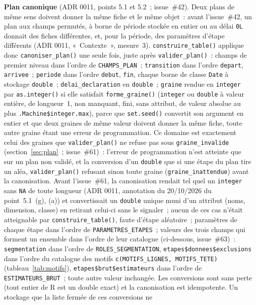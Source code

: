 \documentclass[a4paper,11pt]{article}
\newcommand{\code}[1]{\texttt{\small #1}}
\begin{document}
\noindent
\textbf{Plan canonique} (ADR 0011, points 5.1 et 5.2~; issue~\#42). Deux plans
de même sens doivent donner la même fiche et le même objet~: avant
l'issue~\#42, un plan aux champs permutés, à borne de période stockée en
entier ou au délai \code{0L} donnait des fiches différentes, et, pour la
période, des paramètres d'étape différents (ADR 0011, «~Contexte~»,
mesure~3). \code{construire\_table()}
applique donc \code{canoniser\_plan()} une seule fois, juste après
\code{valider\_plan()}~: champs de premier niveau dans l'ordre de
\code{CHAMPS\_PLAN}~; \code{transition} dans l'ordre \code{depart},
\code{arrivee}~; \code{periode} dans l'ordre \code{debut}, \code{fin},
chaque borne de classe \code{Date} à stockage \code{double}~;
\code{delai\_declaration} en \code{double}~; \code{graine} rendue en
\code{integer} par \code{as.integer()} si elle satisfait
\code{forme\_graine()} (\code{integer} ou \code{double} à valeur entière,
de longueur~1, non manquant, fini, sans attribut, de valeur absolue au plus
\code{.Machine\$integer.max}), parce que \code{set.seed()} convertit son
argument en entier et que deux graines de même valeur doivent donner la même
fiche, toute autre graine étant une erreur de programmation. Ce domaine est
exactement celui des graines que \code{valider\_plan()} ne refuse pas
sous \code{graine\_invalide} (section~\ref{sec:plan}~; issue~\#61)~: l'erreur de
programmation n'est atteinte que sur un plan non validé, et la conversion
d'un \code{double} que si une étape du plan tire un aléa,
\code{valider\_plan()} refusant sinon toute graine
(\code{graine\_inattendue}) avant la canonisation. Avant l'issue~\#61, la
canonisation rendait tel quel un \code{integer} sans \code{NA} de toute
longueur (ADR 0011, annotation du 20/10/2026 du point~5.1~(g), (a)) et
convertissait un \code{double} unique muni d'un attribut (noms, dimension,
classe) en retirant celui-ci sans le signaler~; aucun de ces cas n'était atteignable par
\code{construire\_table()}, faute d'étape aléatoire~; paramètres de chaque étape dans l'ordre de
\code{PARAMETRES\_ETAPES}~; valeurs des trois champs qui forment un
ensemble dans l'ordre de leur catalogue (ci-dessous, issue~\#63)~:
\code{segmentation} dans l'ordre de \code{ROLES\_SEGMENTATION},
\code{etapes\$donnees\$exclusions} dans l'ordre du catalogue des motifs
\code{c(MOTIFS\_LIGNES, MOTIFS\_TETE)} (tableau~\ref{tab:motifs}),
\code{etapes\$brut\$estimateurs} dans l'ordre de \code{ESTIMATEURS\_BRUT}~;
toute autre valeur inchangée. Les conversions
sont sans perte (tout entier de R est un double exact) et la canonisation
est idempotente. Un stockage que la liste fermée de ces conversions ne
\end{document}
